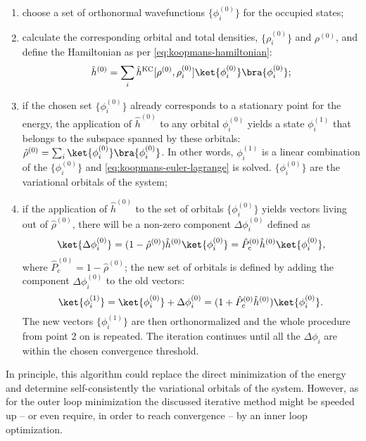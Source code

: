 \begin{enumerate}
    \item choose a set of orthonormal wavefunctions $\{ \phi_i^{(0)} \}$ for the occupied states;
    \item calculate the corresponding orbital and total densities, $\{ \rho_i^{(0)} \}$ and $\rho^{(0)}$, and define the Hamiltonian as per \cref{eq:koopmans-hamiltonian}:
    \begin{equation}
        \hat{h}^{(0)} = \sum_i \hat{h}^{\rm KC}[\rho^{(0)},\rho_i^{(0)}] \ket{\phi_i^{(0)}} \bra{\phi_i^{(0)}} ;
    \end{equation}
    \item if the chosen set $\{ \phi_i^{(0)} \}$ already corresponds to a stationary point for the energy, the application of $\hat{h}^{(0)}$ to any orbital $\phi_i^{(0)}$ yields a state $\phi_i^{(1)}$ that belongs to the subspace spanned by these orbitals: $\hat{\rho}^{(0)} = \sum_i \ket{\phi_i^{(0)}} \bra{\phi_i^{(0)}}$. In other words, $\phi_i^{(1)}$ is a linear combination of the $\{ \phi_i^{(0)} \}$ and \cref{eq:koopmans-euler-lagrange} is solved. $\{ \phi_i^{(0)} \}$ are the variational orbitals of the system;
    \item if the application of $\hat{h}^{(0)}$ to the set of orbitals $\{ \phi_i^{(0)} \}$ yields vectors living out of $\hat{\rho}^{(0)}$, there will be a non-zero component $\Delta \phi_i^{(0)}$ defined as
    \begin{equation}
        \ket{\Delta \phi_i^{(0)}} = (1 - \hat{\rho}^{(0)}) \hat{h}^{(0)} \ket{\phi_i^{(0)}} = \hat{P}^{(0)}_c \hat{h}^{(0)} \ket{\phi_i^{(0)}} ,
        \label{eq:vec-comp-out}
    \end{equation}
    where $\hat{P}^{(0)}_c = 1 - \hat{\rho}^{(0)}$; the new set of orbitals is defined by adding the component $\Delta \phi_i^{(0)}$ to the old vectors:
    \begin{equation}
        \ket{\phi_i^{(1)}} = \ket{\phi_i^{(0)}} + \Delta \phi_i^{(0)} = (1 + \hat{P}^{(0)}_c \hat{h}^{(0)}) \ket{\phi_i^{(0)}} .
        \label{eq:updated-vector}
    \end{equation}
    The new vectors $\{ \phi_i^{(1)} \}$ are then orthonormalized and the whole procedure from point 2 on is repeated. The iteration continues until all the $\Delta \phi_i$ are within the chosen convergence threshold.
\end{enumerate}

In principle, this algorithm could replace the direct minimization of the energy and determine self-consistently the variational orbitals of the system. However, as for the outer loop minimization the discussed iterative method might be speeded up -- or even require, in order to reach convergence -- by an inner loop optimization.